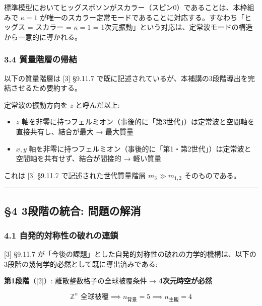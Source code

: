 \documentclass[
  a4paper,11pt]{ltjsarticle}
\providecommand{\tightlist}{%
  \setlength{\itemsep}{0pt}\setlength{\parskip}{0pt}}
\begin{document}
標準模型においてヒッグスボソンがスカラー（スピン0）であることは、本枠組みで
\(\kappa = 1\)
が唯一のスカラー定常モードであることに対応する。すなわち「ヒッグス =
スカラー = \(\kappa = 1\) =
1次元振動」という対応は、定常波モードの構造から一意的に導かれる。

\subsubsection{3.4
質量階層の帰結}\label{ux8ceaux91cfux968eux5c64ux306eux5e30ux7d50}

以下の質量階層は {[}3{]} §9.11.7
で既に記述されているが、本補講の3段階導出を完結させるため要約する。

定常波の振動方向を \(z\) と呼んだ以上:

\begin{itemize}
\tightlist
\item
  \(z\)
  軸を非零に持つフェルミオン（事後的に「第3世代」）は定常波と空間軸を直接共有し、結合が最大
  → 最大質量
\item
  \(x, y\)
  軸を非零に持つフェルミオン（事後的に「第1・第2世代」）は定常波と空間軸を共有せず、結合が間接的
  → 軽い質量
\end{itemize}

これは {[}3{]} §9.11.7 で記述された世代質量階層 \(m_3 \gg m_{1,2}\)
そのものである。

\begin{center}\rule{0.5\linewidth}{0.5pt}\end{center}

\subsection{§4 3段階の統合:
問題の解消}\label{ux6bb5ux968eux306eux7d71ux5408-ux554fux984cux306eux89e3ux6d88}

\subsubsection{4.1
自発的対称性の破れの連鎖}\label{ux81eaux767aux7684ux5bfeux79f0ux6027ux306eux7834ux308cux306eux9023ux9396}

{[}3{]} §9.11.7
が「今後の課題」とした自発的対称性の破れの力学的機構は、以下の3段階の幾何学的必然として既に導出済みである:

\textbf{第1段階}（{[}2{]}）: 離散整数格子の全球被覆条件 →
\textbf{4次元時空が必然}

\[\text{$\mathbb{Z}^n$ 全球被覆} \implies n_{\text{背景}} = 5 \implies n_{\text{主観}} = 4\]
\end{document}
